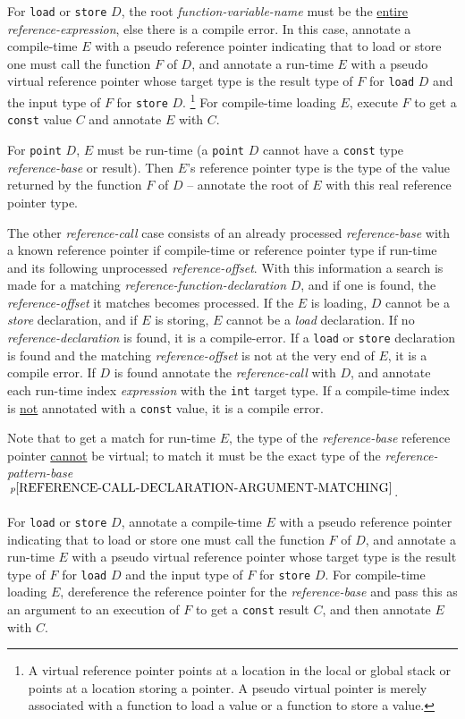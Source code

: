 \documentclass[12pt]{article}
\newcommand{\pagnote}[1]{$\,^{p\pageref{#1}}$}
\begin{document}
\begin{enumerate}
For {\tt load} or {\tt store}
$D$, the root {\em function-variable-name} must be the
\underline{entire} {\em reference-expression}, else there is a
compile error.  In this case, annotate a compile-time $E$ with
a pseudo reference pointer indicating that to load or store one
must call the function $F$ of $D$, and annotate a run-time $E$ with
a pseudo virtual reference pointer whose target type is the
result type of $F$ for {\tt load} $D$ and the input type of $F$
for {\tt store} $D$.
\footnote{A virtual reference pointer points
at a location in the local or global stack or points at a location
storing a pointer.  A pseudo virtual pointer
is merely associated with a function to load a value or a function to store
a value.}
For compile-time loading $E$, execute $F$
to get a {\tt const} value $C$ and annotate $E$ with $C$.

For {\tt point} $D$, $E$ must be run-time
(a {\tt point} $D$ cannot have a {\tt const} type {\em reference-base}
or result).  Then $E$'s reference pointer
type is the type of the value returned by the function $F$ of $D$ --
annotate the root of $E$ with this real reference pointer type.

The other {\em reference-call} case consists of an already processed
{\em reference-base} with a known reference pointer if compile-time
or reference pointer type if run-time
and its following unprocessed {\em reference-offset}.  With this
information a search is made for a matching
{\em reference-function-declaration} $D$, and if one is found,
the {\em reference-offset} it matches becomes processed.
If the $E$ is loading, $D$ cannot be a {\em store} declaration,
and if $E$ is storing, $E$ cannot be a {\em load} declaration.  If no
{\em reference-declaration} is found, it is a compile-error.
If a {\tt load} or {\tt store} declaration is found and the matching
{\em reference-offset} is not at the very end of $E$, it is a
compile error.
If $D$ is found annotate the {\em reference-call} with $D$,
and annotate each run-time index {\em expression}
with the {\tt int} target type.
If a compile-time index is \underline{not}
annotated with a {\tt const} value, it is a compile error.


Note that to get a match for run-time $E$, the type of the
{\em reference-base} reference pointer \underline{cannot} be virtual;
to match it must be the exact type of the {\em reference-pattern-base}
\pagnote{REFERENCE-CALL-DECLARATION-ARGUMENT-MATCHING}.

For {\tt load} or {\tt store} $D$,
annotate a compile-time $E$ with
a pseudo reference pointer indicating that to load or store one
must call the function $F$ of $D$, and annotate a run-time $E$ with
a pseudo virtual reference pointer whose target type is the
result type of $F$ for {\tt load} $D$ and the input type of $F$
for {\tt store} $D$.
For compile-time loading $E$, dereference the reference pointer
for the {\em reference-base} and pass this as an argument to an
execution of $F$ to get a {\tt const} result $C$, and then
annotate $E$ with $C$.


\end{enumerate}
\end{document}
